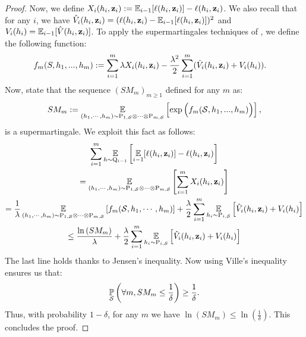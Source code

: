 \begin{noaddcontents}
\begin{proof}
    Now, we define $X_i(h_i,\mathbf{z}_i):= \operatorname*{\mathbb{E}}_{i-1}[\ell(h_i,\mathbf{z}_i)]- \ell(h_i, \mathbf{z}_i)$. We also recall that for any $i$, we have $\hat{V}_i(h_i,\mathbf{z}_i)= (\ell(h_i,\mathbf{z}_i)-\operatorname*{\mathbb{E}}_{i-1}[\ell(h_i,\mathbf{z}_i)])^2$ and $V_i(h_i)= \operatorname*{\mathbb{E}}_{i-1}[\hat{V}(h_i,\mathbf{z}_i)]$.
    To apply the supermartingales techniques of , we define the following function:
    \begin{align*}
       f_m(S,h_1,...,h_m) & := \sum_{i=1}^m \lambda X_i(h_i,\mathbf{z}_i)  - \frac{\lambda^2}{2}\sum_{i=1}^m(\hat{V}_i(h_i,\mathbf{z}_i) + V_i(h_i)).
       \end{align*}
        Now,  state that the sequence $(SM_m)_{m\geq 1}$ defined for any $m$ as:
        \begin{align*}
         SM_m := \operatorname*{\mathbb{E}}_{(h_1,\cdots,h_m) \sim \mathrm{P}_{1,\mathcal{S}} \otimes \cdots \otimes \mathrm{P}_{m,\mathcal{S}}} \left[ \exp \Big( f_m(\mathcal{S},h_1,...,h_m) \Big)  \right],
         \end{align*}
        is a supermartingale. 
        We exploit this fact as follows: 
        \begin{multline*}
            \sum_{i=1}^{m}\operatorname*{\mathbb{E}}_{h\sim\mathrm{Q}_{i-1}}\left[\operatorname*{\mathbb{E}}_{i-1}[\ell(h_i,\mathbf{z}_i)]-\ell(h_i, \mathbf{z}_i)\right] \\= \operatorname*{\mathbb{E}}_{(h_1,\cdots,h_m) \sim \mathrm{P}_{1,\mathcal{S}} \otimes \cdots \otimes \mathrm{P}_{m,\mathcal{S}}} \left[\sum_{i=1}^m X_i(h_i,\mathbf{z}_i)\right] \\
             = \frac{1}{\lambda}\operatorname*{\mathbb{E}}_{(h_1,\cdots,h_m) \sim \mathrm{P}_{1,\mathcal{S}} \otimes \cdots \otimes \mathrm{P}_{m,\mathcal{S}}} \left[ f_m (\mathcal{S},h_1,\cdots,h_m)\right]  + \frac{\lambda}{2} \sum_{i=1}^m \operatorname*{\mathbb{E}}_{h_i\sim \mathrm{P}_{i,\mathcal{S}}}\left[ \hat{V}_i(h_i,\mathbf{z}_i) + V_i(h_i) \right] \\
             \leq \frac{\ln\left( SM_m \right)}{\lambda} + \frac{\lambda}{2} \sum_{i=1}^m \operatorname*{\mathbb{E}}_{h_i\sim \mathrm{P}_{i,\mathcal{S}}}\left[ \hat{V}_i(h_i,\mathbf{z}_i) + V_i(h_i) \right]
        \end{multline*}
        The last line holds thanks to Jensen's inequality.
        Now using Ville's inequality ensures us that:
        \begin{align*}
        \operatorname*{\mathbb{P}}_{\mathcal{S}}\left( \forall m, SM_m \leq \frac{1}{\delta} \right) \geq \frac{1}{\delta}.
        \end{align*}
        Thus, with probability $1-\delta$, for any $m$ we have $\ln\left( SM_m \right) \leq \ln\left( \frac{1}{\delta} \right)$.
        This concludes the proof.
    \end{proof}
    

\end{noaddcontents}
